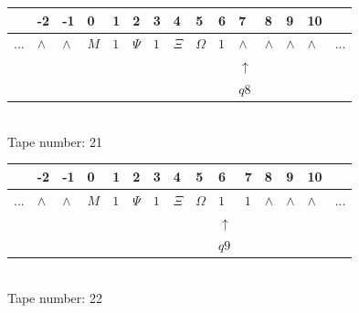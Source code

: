 \documentclass[11pt]{article}
\begin{document}
\begin{table}[H]
\centering
\begin{tabular}{lllllllllllllll}
 & -2 & -1 & 0 & 1 & 2 & 3 & 4 & 5 & 6 & 7 & 8 & 9 & 10 & \\
\hline
$...$ & \multicolumn{1}{|l|}{$\wedge$} & \multicolumn{1}{|l|}{$\wedge$} & \multicolumn{1}{|l|}{$M$} & \multicolumn{1}{|l|}{$1$} & \multicolumn{1}{|l|}{$\Psi$} & \multicolumn{1}{|l|}{$1$} & \multicolumn{1}{|l|}{$\Xi$} & \multicolumn{1}{|l|}{$\Omega$} & \multicolumn{1}{|l|}{$1$} & \multicolumn{1}{|l|}{$\wedge$} & \multicolumn{1}{|l|}{$\wedge$} & \multicolumn{1}{|l|}{$\wedge$} & \multicolumn{1}{|l|}{$\wedge$} & $...$\\
\hline
&  &  &  &  &  &  &  &  &  & $\uparrow$ &  &  &  &  \\
&  &  &  &  &  &  &  &  &  & $ q8 $ &  &  &  &  \\
\end{tabular}
\\
Tape number: 21
\noindent\makebox[\linewidth]{\hdashrule{\textwidth}{1pt}{1pt}}\end{table}

\begin{table}[H]
\centering
\begin{tabular}{lllllllllllllll}
 & -2 & -1 & 0 & 1 & 2 & 3 & 4 & 5 & 6 & 7 & 8 & 9 & 10 & \\
\hline
$...$ & \multicolumn{1}{|l|}{$\wedge$} & \multicolumn{1}{|l|}{$\wedge$} & \multicolumn{1}{|l|}{$M$} & \multicolumn{1}{|l|}{$1$} & \multicolumn{1}{|l|}{$\Psi$} & \multicolumn{1}{|l|}{$1$} & \multicolumn{1}{|l|}{$\Xi$} & \multicolumn{1}{|l|}{$\Omega$} & \multicolumn{1}{|l|}{$1$} & \multicolumn{1}{|l|}{$1$} & \multicolumn{1}{|l|}{$\wedge$} & \multicolumn{1}{|l|}{$\wedge$} & \multicolumn{1}{|l|}{$\wedge$} & $...$\\
\hline
&  &  &  &  &  &  &  &  & $\uparrow$ &  &  &  &  &  \\
&  &  &  &  &  &  &  &  & $ q9 $ &  &  &  &  &  \\
\end{tabular}
\\
Tape number: 22
\noindent\makebox[\linewidth]{\hdashrule{\textwidth}{1pt}{1pt}}\end{table}
\end{document}
